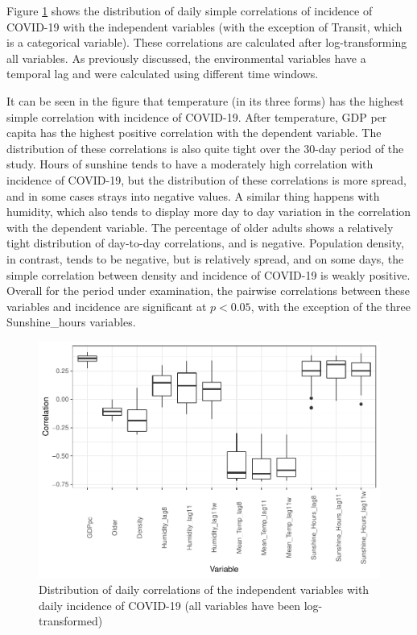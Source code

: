\documentclass[]{elsarticle} %
\makeatletter
\def\maxwidth{\ifdim\Gin@nat@width>\linewidth\linewidth
\else\Gin@nat@width\fi}
\let\Oldincludegraphics\includegraphics
\renewcommand{\includegraphics}[1]{\Oldincludegraphics[width=\maxwidth]{#1}}
\makeatother
\begin{document}
Figure \ref{fig:daily-correlations} shows the distribution of daily
simple correlations of incidence of COVID-19 with the independent
variables (with the exception of Transit, which is a categorical
variable). These correlations are calculated after log-transforming all
variables. As previously discussed, the environmental variables have a
temporal lag and were calculated using different time windows.

It can be seen in the figure that temperature (in its three forms) has
the highest simple correlation with incidence of COVID-19. After
temperature, GDP per capita has the highest positive correlation with
the dependent variable. The distribution of these correlations is also
quite tight over the 30-day period of the study. Hours of sunshine tends
to have a moderately high correlation with incidence of COVID-19, but
the distribution of these correlations is more spread, and in some cases
strays into negative values. A similar thing happens with humidity,
which also tends to display more day to day variation in the correlation
with the dependent variable. The percentage of older adults shows a
relatively tight distribution of day-to-day correlations, and is
negative. Population density, in contrast, tends to be negative, but is
relatively spread, and on some days, the simple correlation between
density and incidence of COVID-19 is weakly positive. Overall for the
period under examination, the pairwise correlations between these
variables and incidence are significant at \(p<0.05\), with the
exception of the three Sunshine\_hours variables.

\begin{figure}
\centering
\includegraphics{Environmental-Correlates-of-COVID19-Spain_files/figure-latex/daily-correlations-1.pdf}
\caption{\label{fig:daily-correlations}Distribution of daily
correlations of the independent variables with daily incidence of
COVID-19 (all variables have been log-transformed)}
\end{figure}
\end{document}
